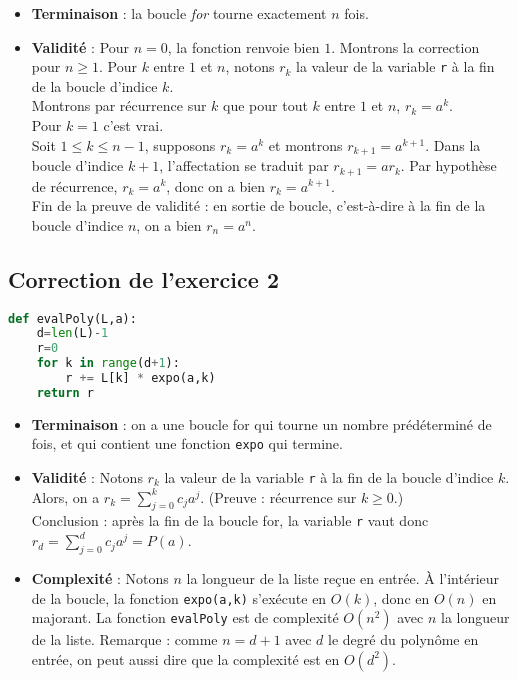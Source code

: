 \documentclass[11pt,a4paper]{article}
\begin{document}
\begin{itemize}
\item \textbf{Terminaison} : la boucle \textit{for} tourne exactement $n$ fois.
\item \textbf{Validité} : Pour $n=0$, la fonction renvoie bien $1$. Montrons la correction pour $n\geq 1$. Pour $k$ entre $1$ et $n$, notons $r_k$ la valeur de la variable \verb+r+ à la fin de la boucle d'indice $k$.\\
Montrons par récurrence sur $k$ que pour tout $k$ entre $1$ et $n$, $r_k = a^k$.\\
Pour $k=1$ c'est vrai.\\
Soit $1\leq k \leq n-1$, supposons $r_k = a^k$ et montrons $r_{k+1} = a^{k+1}$. Dans la boucle d'indice $k+1$, l'affectation se traduit par $r_{k+1} = ar_k$. Par hypothèse de récurrence, $r_k=a^k$, donc on a bien $r_k=a^{k+1}$.\\
Fin de la preuve de validité : en sortie de boucle, c'est-à-dire à la fin de la boucle d'indice $n$, on a bien $r_n = a^n$.
\end{itemize}

\subsection*{Correction de l'exercice 2}

\begin{lstlisting}[language=Python]
def evalPoly(L,a):
	d=len(L)-1
	r=0
	for k in range(d+1):
		r += L[k] * expo(a,k)
	return r
\end{lstlisting}
\begin{itemize}
\item \textbf{Terminaison} : on a une boucle for qui tourne un nombre prédéterminé de fois, et qui contient une fonction \verb+expo+ qui termine.
\item \textbf{Validité} : Notons $r_k$ la valeur de la variable \texttt{r} à la fin de la boucle d'indice $k$.
Alors, on a $r_k = \sum_{j=0}^k c_ja^j$. (Preuve : récurrence sur $k\geq 0$.)\\
Conclusion : après la fin de la boucle for, la variable \verb+r+ vaut donc $r_d = \sum_{j=0}^d c_ja^j = P(a)$.
\item \textbf{Complexité} : Notons $n$ la longueur de la liste reçue en entrée.
À l'intérieur de la boucle, la fonction \verb+expo(a,k)+ s'exécute en  $O(k)$, donc en $O(n)$ en majorant.
La fonction \verb+evalPoly+ est de complexité $O(n^2)$ avec $n$ la longueur de la liste. 
Remarque : comme $n=d+1$ avec $d$ le degré du polynôme en entrée, on peut aussi dire que la complexité est en $O(d^2)$.
\end{itemize}
\end{document}
